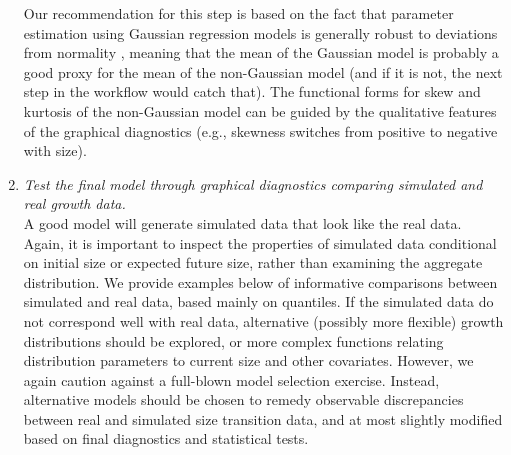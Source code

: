 \documentclass[12pt]{article}
\begin{document}
\begin{enumerate}[label=\arabic*., listparindent=1.5em]
Our recommendation for this step is based on the fact that parameter estimation using Gaussian regression models is generally robust to deviations from normality \citep{schielzeth2020robustness}, meaning that the mean of the Gaussian model is probably a good proxy for the mean of the non-Gaussian model (and if it is not, the next step in the workflow would catch that). 
The functional forms for skew and kurtosis of the non-Gaussian model can be guided by the qualitative features of the graphical diagnostics (e.g., skewness switches from positive to negative with size). 

\item \textit{Test the final model through graphical diagnostics comparing simulated and real growth data.} 
\\
A good model will generate simulated data that look like the real data.  
Again, it is important to inspect the properties of simulated data conditional on initial size or expected future size, rather than examining the aggregate distribution.   
We provide examples below of informative comparisons between simulated and real data, based mainly on quantiles. 
If the simulated data do not correspond well with real data, alternative (possibly more flexible) growth distributions should be explored, or more complex functions relating distribution parameters to current size and other covariates. 
However, we again caution against a full-blown model selection exercise. 
Instead, alternative models should be chosen to remedy observable discrepancies between real and simulated size transition data, and at most slightly modified based on final diagnostics and statistical tests.

\end{enumerate}
\end{document}
